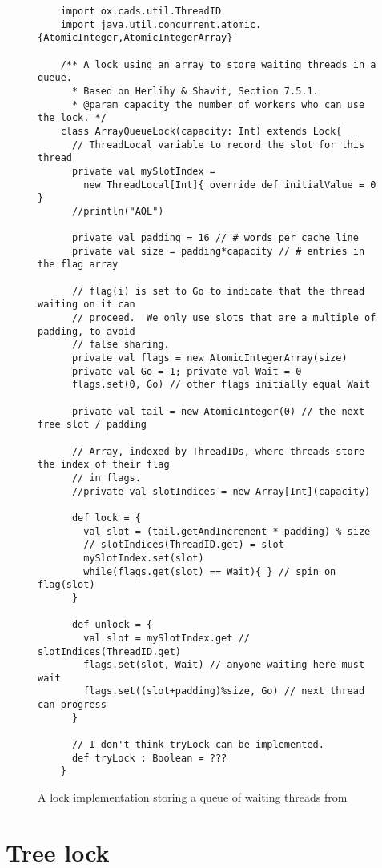 \begin{figure}
  \begin{lstlisting}
    import ox.cads.util.ThreadID
    import java.util.concurrent.atomic.{AtomicInteger,AtomicIntegerArray}

    /** A lock using an array to store waiting threads in a queue.
      * Based on Herlihy & Shavit, Section 7.5.1.
      * @param capacity the number of workers who can use the lock. */ 
    class ArrayQueueLock(capacity: Int) extends Lock{
      // ThreadLocal variable to record the slot for this thread
      private val mySlotIndex = 
        new ThreadLocal[Int]{ override def initialValue = 0 }
      //println("AQL")

      private val padding = 16 // # words per cache line 
      private val size = padding*capacity // # entries in the flag array

      // flag(i) is set to Go to indicate that the thread waiting on it can
      // proceed.  We only use slots that are a multiple of padding, to avoid
      // false sharing.
      private val flags = new AtomicIntegerArray(size)
      private val Go = 1; private val Wait = 0
      flags.set(0, Go) // other flags initially equal Wait

      private val tail = new AtomicInteger(0) // the next free slot / padding

      // Array, indexed by ThreadIDs, where threads store the index of their flag
      // in flags.
      //private val slotIndices = new Array[Int](capacity)

      def lock = {
        val slot = (tail.getAndIncrement * padding) % size
        // slotIndices(ThreadID.get) = slot
        mySlotIndex.set(slot)
        while(flags.get(slot) == Wait){ } // spin on flag(slot)
      }

      def unlock = {
        val slot = mySlotIndex.get // slotIndices(ThreadID.get)
        flags.set(slot, Wait) // anyone waiting here must wait
        flags.set((slot+padding)%size, Go) // next thread can progress
      }

      // I don't think tryLock can be implemented. 
      def tryLock : Boolean = ???
    }
  \end{lstlisting}
  \caption{A lock implementation storing a queue of waiting threads from \cite{TAoMP} \label{fig:QueueScala}}
\end{figure}

\section{Tree lock}